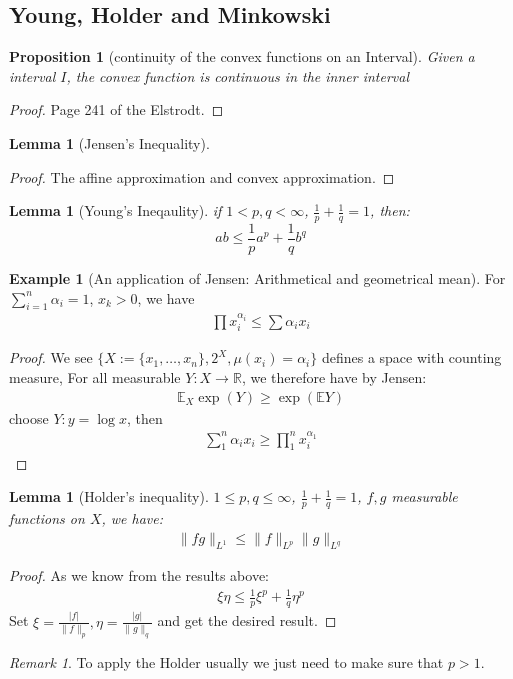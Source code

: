 \documentclass[a4paper,11pt,oneside,fleqn]{book}
\newtheorem{lemma}[theorem]{Lemma}
\newtheorem{proposition}[theorem]{Proposition}
\theoremstyle{definition}
\newtheorem*{example}{Example}
\theoremstyle{remark}
\newtheorem*{remark}{Remark}
\begin{document}
\subsection{Young, Holder and Minkowski}
\begin{proposition}[continuity of the convex functions on an Interval] Given a interval $I$, the convex function is continuous in the inner interval
\end{proposition}
\begin{proof}
	Page 241 of the Elstrodt.
\end{proof}

\begin{lemma}[Jensen's Inequality]
\end{lemma}
\begin{proof}
	The affine approximation and convex approximation.
\end{proof}

\begin{lemma}[Young's Ineqaulity]
if $1 < p, q < \infty$, $\frac{1}{p} + \frac{1}{q} = 1$, then:
\begin{equation*}
	ab \leq \frac{1}{p}a^p + \frac{1}{q}b^q
\end{equation*}
\end{lemma}

\begin{example}[An application of Jensen: Arithmetical and geometrical mean]
For $\sum_{i = 1}^n \alpha_i = 1$, $x_k > 0$, we have
	\begin{align*}
		\prod x_i^{\alpha_i} \leq \sum \alpha_i x_i 
	\end{align*}
\end{example}
\begin{proof}
	We see $\{ X := \{x_1, \dots, x_n\}, 2^X, \mu(x_i) = \alpha_i  \}$ defines a space with counting measure, For all measurable $Y: X \rightarrow\mathbb{R}$,  we therefore have by Jensen:
	\begin{align*}
		\mathbb{E}_X \exp(Y) \geq \exp(\mathbb{E} Y)
	\end{align*}
	choose $Y: y = \log x$, then
	\begin{align*}
		\sum_1^n \alpha_i x_i \geq \prod_1^n x_i^{\alpha_1} 
	\end{align*}
\end{proof}

\begin{lemma}[Holder's inequality]
$1 \leq p, q \leq \infty$, $\frac{1}{p} + \frac{1}{q} = 1$, $f, g$ measurable functions on $X$, we have:
\begin{align*}
	\|fg\|_{L^1} \leq \|f\|_{L^p} \|g\|_{L^q}
\end{align*}
\end{lemma}
\begin{proof}
	As we know from the results above:
	\begin{align*}
		\xi \eta \leq \frac{1}{p}\xi^p + \frac{1}{q}\eta^p
	\end{align*}
	Set $\xi = \frac{|f|}{\|f\|_p}, \eta = \frac{|g|}{\|g\|_q}$ and get the desired result.
\end{proof}
\begin{remark}
To apply the Holder usually we just need to make sure that $p > 1$.	
\end{remark}
\end{document}
